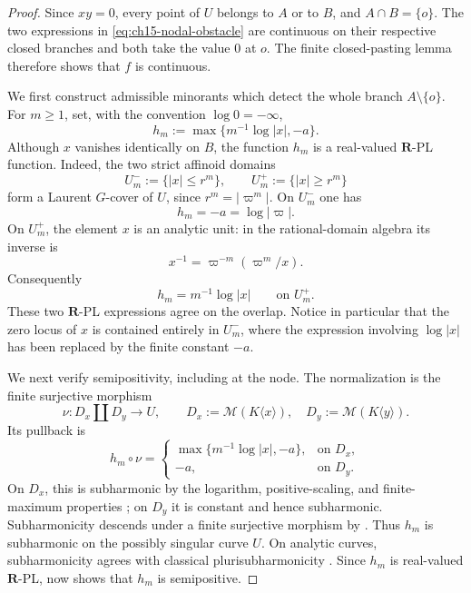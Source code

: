 \begin{proof}
Since \(xy=0\), every point of \(U\) belongs to \(A\) or to \(B\), and
\(A\cap B=\{o\}\).  The two expressions in
\eqref{eq:ch15-nodal-obstacle} are continuous on their respective closed
branches and both take the value \(0\) at \(o\).  The finite closed-pasting
lemma therefore shows that \(f\) is continuous.

We first construct admissible minorants which detect the whole branch
\(A\setminus\{o\}\).  For \(m\geq1\), set, with the convention
\(\log0=-\infty\),
\begin{equation}
\label{eq:ch15-nodal-hm}
                  h_m:=\max\{m^{-1}\log|x|,-a\}.
\end{equation}
Although \(x\) vanishes identically on \(B\), the function \(h_m\) is a
real-valued \(\mathbf R\)-PL function.  Indeed, the two strict affinoid
domains
\[
 U_m^-:=\{|x|\leq r^m\},
 \qquad
 U_m^+:=\{|x|\geq r^m\}
\]
form a Laurent \(G\)-cover of \(U\), since \(r^m=|\varpi^m|\).  On \(U_m^-\)
one has
\[
                         h_m=-a=\log|\varpi|.
\]
On \(U_m^+\), the element \(x\) is an analytic unit: in the rational-domain
algebra its inverse is
\[
                  x^{-1}=\varpi^{-m}(\varpi^m/x).
\]
Consequently
\[
                         h_m=m^{-1}\log|x|
                         \qquad\text{on }U_m^+.
\]
These two \(\mathbf R\)-PL expressions agree on the overlap.  Notice in
particular that the zero locus of \(x\) is contained entirely in \(U_m^-\),
where the expression involving \(\log|x|\) has been replaced by the finite
constant \(-a\).

We next verify semipositivity, including at the node.  The normalization is
the finite surjective morphism
\[
 \nu:D_x\amalg D_y\longrightarrow U,
 \qquad
 D_x:=\mathcal M(K\langle x\rangle),
 \quad
 D_y:=\mathcal M(K\langle y\rangle).
\]
Its pullback is
\[
 h_m\circ\nu=
 \begin{cases}
  \max\{m^{-1}\log|x|,-a\},&\text{on }D_x,\\
  -a,&\text{on }D_y.
 \end{cases}
\]
On \(D_x\), this is subharmonic by the logarithm, positive-scaling, and
finite-maximum properties
\cite[Proposition~3.5(2),(4)]{GR25Classical}; on \(D_y\) it is constant and
hence subharmonic.  Subharmonicity descends under a finite surjective
morphism by \cite[Proposition~3.5(8)]{GR25Classical}.  Thus \(h_m\) is
subharmonic on the possibly singular curve \(U\).  On analytic curves,
subharmonicity agrees with classical plurisubharmonicity
\cite[\S4.1.2]{GR25Classical}.  Since \(h_m\) is real-valued
\(\mathbf R\)-PL, \cite[Theorem~4.3]{GR25Classical} now shows that \(h_m\)
is semipositive.


\end{proof}
